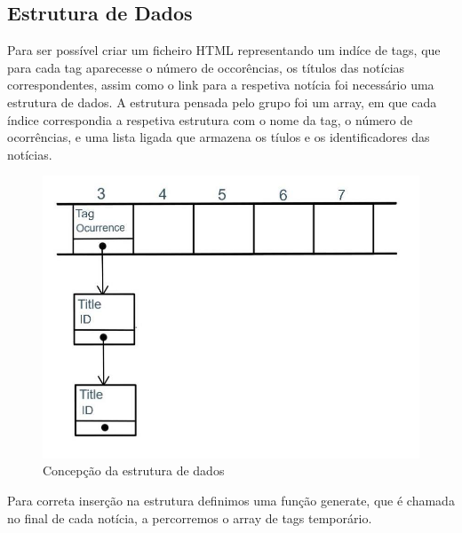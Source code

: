 \documentclass[25pt]{article}
\begin{document}
    \subsection{Estrutura de Dados}
    Para ser possível criar um ficheiro HTML representando um indíce de tags, que para cada tag aparecesse o número de occorências, os títulos das notícias correspondentes,
    assim como o link para a respetiva notícia foi necessário uma estrutura de dados. A estrutura pensada pelo grupo foi um array, em que cada índice
    correspondia a respetiva estrutura com o nome da tag, o número de ocorrências, e uma lista ligada que armazena os tíulos e os identificadores das notícias.
    \begin{figure}
    \centering\includegraphics[scale=0.40]{estrutura}
    \caption{\label{fig:controller}Concepção da estrutura de dados}
    \end{figure}
    \newpage
    Para correta inserção na estrutura definimos uma função generate, que é chamada no final de cada notícia, a percorremos o array de tags temporário.
\end{document}
